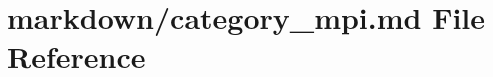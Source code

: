 \hypertarget{category__mpi_8md}{}\section{markdown/category\+\_\+mpi.md File Reference}
\label{category__mpi_8md}
